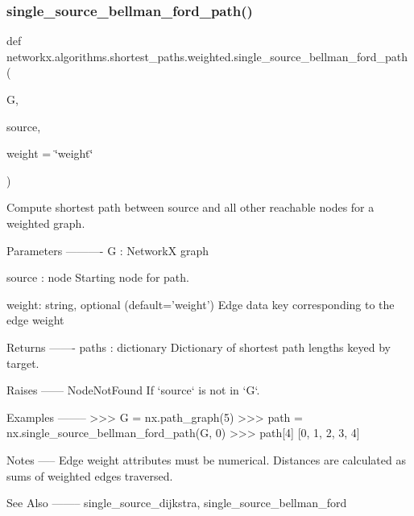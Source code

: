 \subsubsection{\texorpdfstring{single\+\_\+source\+\_\+bellman\+\_\+ford\+\_\+path()}{single\_source\_bellman\_ford\_path()}}
{\footnotesize\ttfamily def networkx.\+algorithms.\+shortest\+\_\+paths.\+weighted.\+single\+\_\+source\+\_\+bellman\+\_\+ford\+\_\+path (\begin{DoxyParamCaption}\item[{}]{G,  }\item[{}]{source,  }\item[{}]{weight = {\ttfamily \char`\"{}weight\char`\"{}} }\end{DoxyParamCaption})}

\begin{DoxyVerb}Compute shortest path between source and all other reachable
nodes for a weighted graph.

Parameters
----------
G : NetworkX graph

source : node
    Starting node for path.

weight: string, optional (default='weight')
    Edge data key corresponding to the edge weight

Returns
-------
paths : dictionary
    Dictionary of shortest path lengths keyed by target.

Raises
------
NodeNotFound
    If `source` is not in `G`.

Examples
--------
>>> G = nx.path_graph(5)
>>> path = nx.single_source_bellman_ford_path(G, 0)
>>> path[4]
[0, 1, 2, 3, 4]

Notes
-----
Edge weight attributes must be numerical.
Distances are calculated as sums of weighted edges traversed.

See Also
--------
single_source_dijkstra, single_source_bellman_ford\end{DoxyVerb}
 \mbox{\label{namespacenetworkx_1_1algorithms_1_1shortest__paths_1_1weighted_ac0621107112bb024e746959e343f53e3}} 

